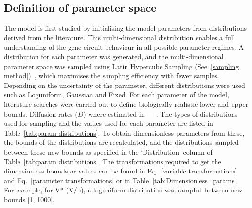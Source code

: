 \subsection{Definition of parameter space}
The model is first studied by initialising the model parameters from distributions derived from the literature.
This multi-dimensional distribution enables a full understanding of the gene circuit behaviour in all possible parameter regimes.
A distribution for each parameter was generated, and the multi-dimensional parameter space was sampled using Latin Hypercube Sampling (See~\ref{sampling method})~\parencite{Iman2014, Bergstra2012}, which maximises the sampling efficiency with fewer samples.
Depending on the uncertainty of the parameter, different distributions were used such as Loguniform, Gaussian and Fixed.
 For each parameter of the model, literature searches were carried out to define biologically realistic lower and upper bounds.
Diffusion rates ($D$) where estimated in --- .%
The types of distributions used for sampling and the values used for each parameter are listed in Table~\ref{tab:param distributions}.
To obtain dimensionless parameters from these, the bounds of the distributions are recalculated, and the distributions sampled between these new bounds as specified in the ‘Distribution’ column of Table~\ref{tab:param distributions}.
The transformations required to get the dimensionless bounds or values can be found in Eq.~\ref{variable transformations} and Eq.~\ref{parameter transformations} or in Table~\ref{tab:Dimensionless_params}.
For example, for V* (V/b), a loguniform distribution was sampled between new bounds [1, 1000].
